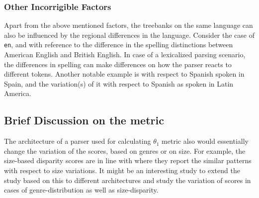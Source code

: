 \subsubsection{Other Incorrigible Factors}

Apart from the above mentioned factors, the treebanks on the same language can also be influenced by the regional differences in the language. Consider the case of \verb|en|, and with reference to the difference in the spelling distinctions between American English and British English. In case of a lexicalized parsing scenario, the differences in spelling can make differences on how the parser reacts to different tokens. Another notable example is with respect to Spanish spoken in Spain, and the variation(s) of it with respect to Spanish as spoken in Latin America.

\subsection{Brief Discussion on the metric}

The architecture of a parser used for calculating \(\theta_{1}\) metric also would essentially change the variation of the scores, based on genres or on size. For example, the size-based disparity scores are in line with \cite{velldal-etal-2017-joint} where they report the similar patterns with respect to size variations. It might be an interesting study to extend the study based on this to different architectures and study the variation of scores in cases of genre-distribution as well as size-disparity.

\newpage
